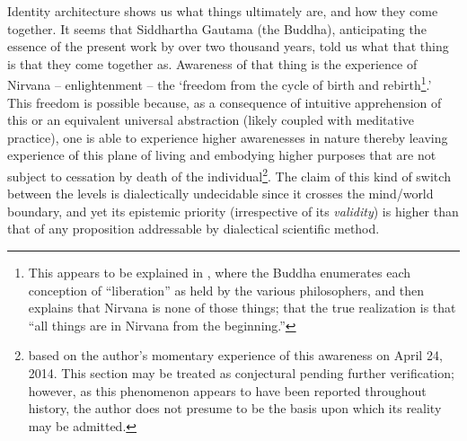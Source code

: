 \documentclass[pra,twocolumn,groupedaddress,10pt]{revtex4}
\theoremstyle{definition}
\begin{document}
Identity architecture shows us what things ultimately are, and how they come together. It seems that Siddhartha Gautama (the Buddha), anticipating the essence of the present work by over two thousand years, told us what that thing is that they come together as. Awareness of that thing is the experience of Nirvana -- enlightenment -- the `freedom from the cycle of birth and rebirth\footnote{This appears to be explained in \cite{lankavatara}, where the Buddha enumerates each conception of ``liberation'' as held by the various philosophers, and then explains that Nirvana is none of those things; that the true realization is that ``all things are in Nirvana from the beginning.''}.' This freedom is possible because, as a consequence of intuitive apprehension of this or an equivalent universal abstraction (likely coupled with meditative practice), one is able to experience higher awarenesses in nature thereby leaving experience of this plane of living and embodying higher purposes that are not subject to cessation by death of the individual\footnote{based on the author's momentary experience of this awareness on April 24, 2014. This section may be treated as conjectural pending further verification; however, as this phenomenon appears to have been reported throughout history, the author does not presume to be the basis upon which its reality may be admitted.}. The claim of this kind of switch between the levels is dialectically undecidable since it crosses the mind/world boundary, and yet its epistemic priority (irrespective of its \textit{validity}) is higher than that of any proposition addressable by dialectical scientific method.
\end{document}
